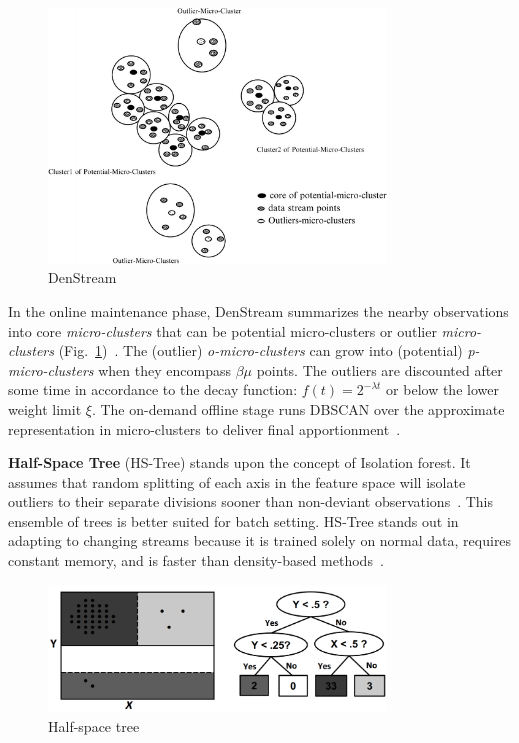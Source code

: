 \begin{figure}[ht]
    \centering
    \includegraphics[width=0.8\textwidth]{assets/analysis/DenStream.png}
    \caption{DenStream~\cite{amini_density_2012}}
    \label{fig:denstream}
\end{figure}

In the online maintenance phase, DenStream summarizes the nearby observations into core \emph{micro-clusters} that can be potential micro-clusters or outlier \emph{micro-clusters} (Fig.~\ref{fig:denstream})~\cite{ghesmoune_state---art_2016}. The (outlier) \emph{o-micro-clusters} can grow into (potential) \emph{p-micro-clusters} when they encompass $\beta \mu$ points. The outliers are discounted after some time in accordance to the decay function: $f(t) = 2^{-\lambda t}$ or below the lower weight limit $\xi$. The on-demand offline stage runs DBSCAN over the approximate representation in micro-clusters to deliver final apportionment~\cite{cao_density-based_2006}.
\bigbreak

\textbf{Half-Space Tree} (HS-Tree) stands upon the concept of Isolation forest. It assumes that random splitting of each axis in the feature space will isolate outliers to their separate divisions sooner than non-deviant observations~\cite{gervasi_anomaly_2020,torres_automatic_2022}. This ensemble of trees is better suited for batch setting. HS-Tree stands out in adapting to changing streams because it is trained solely on normal data, requires constant memory, and is faster than density-based methods~\cite{tan_fast_2011}.

\begin{figure}[ht]
    \centering
    \includegraphics[width=0.8\textwidth]{assets/analysis/HS-Tree.png}
    \caption{Half-space tree~\cite{tan_fast_2011}}
\end{figure}

